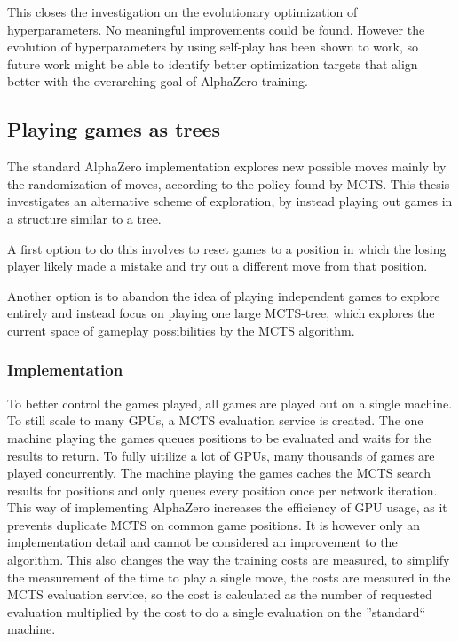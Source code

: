 \documentclass[12pt,onecolumn,oneside,titlepage]{article}
\begin{document}
This closes the investigation on the evolutionary optimization of hyperparameters. No meaningful improvements could be found. However the evolution of hyperparameters by using self-play has been shown to work,
so future work might be able to identify better optimization targets that align better with the overarching goal of AlphaZero training.


\subsection{Playing games as trees}

The standard AlphaZero implementation explores new possible moves mainly by the randomization of moves, according to the policy found by MCTS.
This thesis investigates an alternative scheme of exploration, by instead playing out games in a structure similar to a tree.

A first option to do this involves to reset games to a position in which the losing player likely made a mistake and try out a different move from that position.

Another option is to abandon the idea of playing independent games to explore entirely and instead focus on playing one large MCTS-tree, which explores the current space of gameplay possibilities by the MCTS algorithm.

\subsubsection{Implementation}

To better control the games played, all games are played out on a single machine. To still scale to many GPUs, a MCTS evaluation service is created. The one machine playing the games queues positions to be evaluated and waits for
the results to return. To fully uitilize a lot of GPUs, many thousands of games are played concurrently. The machine playing the games caches the MCTS search results for positions and only queues every position once per network iteration. This 
way of implementing AlphaZero increases the efficiency of GPU usage, as it prevents duplicate MCTS on common game positions. It is however only an implementation detail and cannot be considered an improvement to the algorithm.
This also changes the way the training costs are measured, to simplify the measurement of the time to play a single move, the costs are measured in the MCTS evaluation service, so the cost is calculated as the number of requested evaluation multiplied
by the cost to do a single evaluation on the ''standard`` machine.
\end{document}
